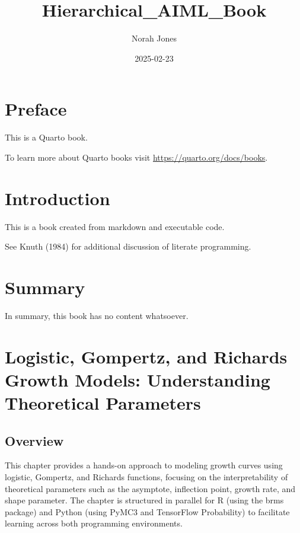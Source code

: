 \documentclass[
  letterpaper,
  DIV=11,
  numbers=noendperiod]{scrreprt}
\title{Hierarchical\_AIML\_Book}
\author{Norah Jones}
\date{2025-02-23}
\renewcommand*\contentsname{Table of contents}
\newcommand\contentsname{Table of contents}
\begin{document}
\maketitle

\renewcommand*\contentsname{Table of contents}
{
\hypersetup{linkcolor=}
\setcounter{tocdepth}{2}
\tableofcontents
}


\chapter*{Preface}\label{preface}


This is a Quarto book.

To learn more about Quarto books visit
\url{https://quarto.org/docs/books}.


\chapter{Introduction}\label{introduction}

This is a book created from markdown and executable code.

See Knuth (1984) for additional discussion of literate programming.


\chapter{Summary}\label{summary}

In summary, this book has no content whatsoever.


\chapter{Logistic, Gompertz, and Richards Growth Models: Understanding
Theoretical
Parameters}\label{logistic-gompertz-and-richards-growth-models-understanding-theoretical-parameters}

\section{Overview}\label{overview}

This chapter provides a hands-on approach to modeling growth curves
using logistic, Gompertz, and Richards functions, focusing on the
interpretability of theoretical parameters such as the asymptote,
inflection point, growth rate, and shape parameter. The chapter is
structured in parallel for R (using the brms package) and Python (using
PyMC3 and TensorFlow Probability) to facilitate learning across both
programming environments.
\end{document}
